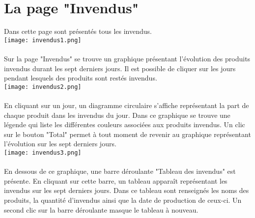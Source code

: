 \section{La page "Invendus"}
Dans cette page sont présentés tous les invendus.\\
\texttt{[image: invendus1.png]}
\paragraph{}
Sur la page "Invendus" se trouve un graphique présentant l'évolution des produits
invendus durant les sept derniers jours. Il est possible de cliquer sur les 
jours pendant lesquels des produits sont restés invendus.\\ 
\texttt{[image: invendus2.png]}
\paragraph{}
En cliquant sur un jour, un diagramme circulaire s'affiche représentant la part de chaque produit dans les 
invendus du jour. Dans ce graphique se trouve une légende qui liste les 
différentes couleurs associées aux produits invendus. Un clic sur le bouton 
"Total" permet à tout moment de revenir au graphique représentant l'évolution 
sur les sept derniers jours.\\
\texttt{[image: invendus3.png]}
\paragraph{}
En dessous de ce graphique, une barre déroulante "Tableau des invendus" est 
présente. En cliquant sur cette barre, un tableau apparaît représentant les
invendus sur les sept derniers jours. Dans ce tableau sont renseignés les noms 
des produits, la quantité d'invendus ainsi que la date de production de ceux-ci.
Un second clic sur la barre déroulante masque le tableau à nouveau.
